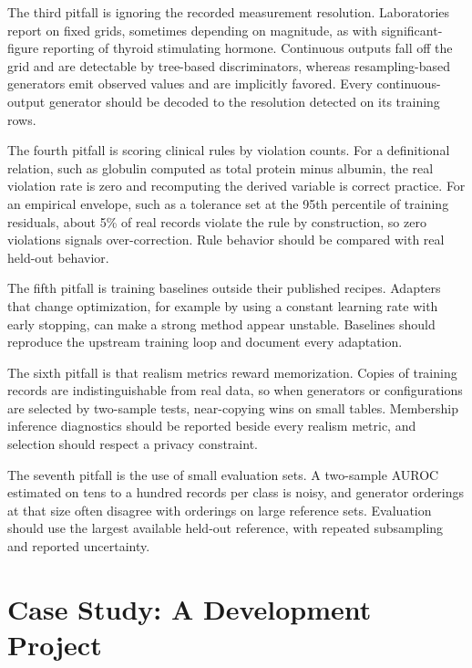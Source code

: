 \documentclass[conference]{IEEEtran}
\begin{document}
The third pitfall is ignoring the recorded measurement resolution. Laboratories report on fixed grids, sometimes depending on magnitude, as with significant-figure reporting of thyroid stimulating hormone. Continuous outputs fall off the grid and are detectable by tree-based discriminators, whereas resampling-based generators emit observed values and are implicitly favored. Every continuous-output generator should be decoded to the resolution detected on its training rows.

The fourth pitfall is scoring clinical rules by violation counts. For a definitional relation, such as globulin computed as total protein minus albumin, the real violation rate is zero and recomputing the derived variable is correct practice. For an empirical envelope, such as a tolerance set at the 95th percentile of training residuals, about 5\% of real records violate the rule by construction, so zero violations signals over-correction. Rule behavior should be compared with real held-out behavior.

The fifth pitfall is training baselines outside their published recipes. Adapters that change optimization, for example by using a constant learning rate with early stopping, can make a strong method appear unstable. Baselines should reproduce the upstream training loop and document every adaptation.

The sixth pitfall is that realism metrics reward memorization. Copies of training records are indistinguishable from real data, so when generators or configurations are selected by two-sample tests, near-copying wins on small tables. Membership inference diagnostics should be reported beside every realism metric, and selection should respect a privacy constraint.

The seventh pitfall is the use of small evaluation sets. A two-sample AUROC estimated on tens to a hundred records per class is noisy, and generator orderings at that size often disagree with orderings on large reference sets. Evaluation should use the largest available held-out reference, with repeated subsampling and reported uncertainty.

\section{Case Study: A Development Project}
\end{document}
